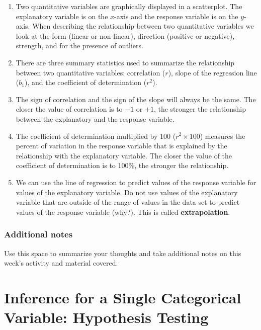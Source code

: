 \documentclass[
]{report}
\begin{document}
\begin{enumerate}
\def\labelenumi{\arabic{enumi}.}
\item
  Two quantitative variables are graphically displayed in a scatterplot. The explanatory variable is on the \(x\)-axis and the response variable is on the \(y\)-axis. When describing the relationship between two quantitative variables we look at the form (linear or non-linear), direction (positive or negative), strength, and for the presence of outliers.
\item
  There are three summary statistics used to summarize the relationship between two quantitative variables: correlation (\(r\)), slope of the regression line (\(b_1\)), and the coefficient of determination (\(r^2\)).
\item
  The sign of correlation and the sign of the slope will always be the same. The closer the value of correlation is to \(-1\) or \(+1\), the stronger the relationship between the explanatory and the response variable.
\item
  The coefficient of determination multiplied by 100 (\(r^2 \times 100\)) measures the percent of variation in the response variable that is explained by the relationship with the explanatory variable. The closer the value of the coefficient of determination is to 100\%, the stronger the relationship.
\item
  We can use the line of regression to predict values of the response variable for values of the explanatory variable. Do not use values of the explanatory variable that are outside of the range of values in the data set to predict values of the response variable (why?). This is called \textbf{extrapolation}.
\end{enumerate}

\newpage

\hypertarget{additional-notes-4}{%
\subsection{Additional notes}\label{additional-notes-4}}

Use this space to summarize your thoughts and take additional notes on this week's activity and material covered.

\hypertarget{inference-for-a-single-categorical-variable-hypothesis-testing}{%
\chapter{Inference for a Single Categorical Variable: Hypothesis Testing}\label{inference-for-a-single-categorical-variable-hypothesis-testing}}
\end{document}
